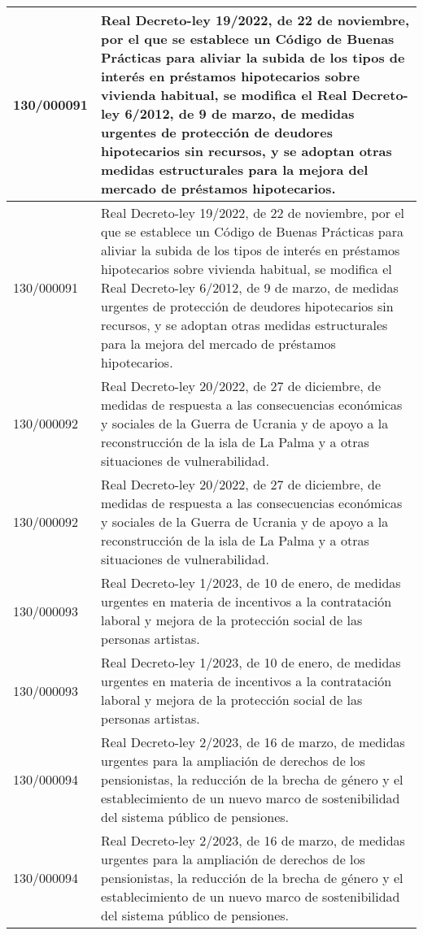 {\begin{table}[H]
\begin{center}
\begin{tabularx}{\linewidth}{| l | X |}
\hline
130/000091 & Real Decreto-ley 19/2022, de 22 de noviembre, por el que se establece un Código de Buenas Prácticas para aliviar la subida de los tipos de interés en préstamos hipotecarios sobre vivienda habitual, se modifica el Real Decreto-ley 6/2012, de 9 de marzo, de medidas urgentes de protección de deudores hipotecarios sin recursos, y se adoptan otras medidas estructurales para la mejora del mercado de préstamos hipotecarios. \\
\hline
130/000091 & Real Decreto-ley 19/2022, de 22 de noviembre, por el que se establece un Código de Buenas Prácticas para aliviar la subida de los tipos de interés en préstamos hipotecarios sobre vivienda habitual, se modifica el Real Decreto-ley 6/2012, de 9 de marzo, de medidas urgentes de protección de deudores hipotecarios sin recursos, y se adoptan otras medidas estructurales para la mejora del mercado de préstamos hipotecarios. \\
\hline
130/000092 & Real Decreto-ley 20/2022, de 27 de diciembre, de medidas de respuesta a las consecuencias económicas y sociales de la Guerra de Ucrania y de apoyo a la reconstrucción de la isla de La Palma y a otras situaciones de vulnerabilidad. \\
\hline
130/000092 & Real Decreto-ley 20/2022, de 27 de diciembre, de medidas de respuesta a las consecuencias económicas y sociales de la Guerra de Ucrania y de apoyo a la reconstrucción de la isla de La Palma y a otras situaciones de vulnerabilidad. \\
\hline
130/000093 & Real Decreto-ley 1/2023, de 10 de enero, de medidas urgentes en materia de incentivos a la contratación laboral y mejora de la protección social de las personas artistas. \\
\hline
130/000093 & Real Decreto-ley 1/2023, de 10 de enero, de medidas urgentes en materia de incentivos a la contratación laboral y mejora de la protección social de las personas artistas. \\
\hline
130/000094 & Real Decreto-ley 2/2023, de 16 de marzo, de medidas urgentes para la ampliación de derechos de los pensionistas, la reducción de la brecha de género y el establecimiento de un nuevo marco de sostenibilidad del sistema público de pensiones. \\
\hline
130/000094 & Real Decreto-ley 2/2023, de 16 de marzo, de medidas urgentes para la ampliación de derechos de los pensionistas, la reducción de la brecha de género y el establecimiento de un nuevo marco de sostenibilidad del sistema público de pensiones. \\

\end{tabularx}
\end{center}
\end{table}}
